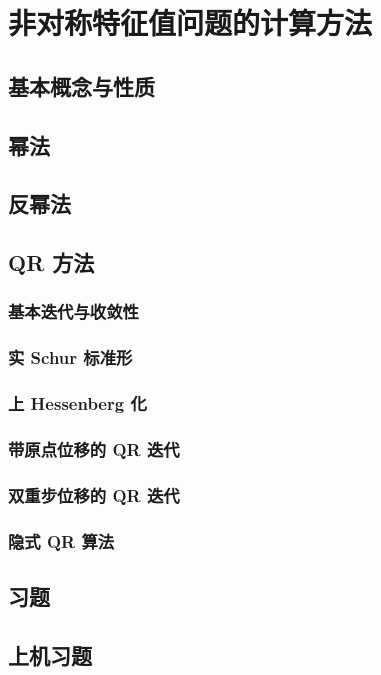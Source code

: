 \chapter{非对称特征值问题的计算方法}

\section{基本概念与性质}

\pending

\section{幂法}

\pending

\section{反幂法}

\pending

\section{QR 方法}

\subsection{基本迭代与收敛性}

\pending

\subsection{实 Schur 标准形}

\pending

\subsection{上 Hessenberg 化}

\pending

\subsection{带原点位移的 QR 迭代}

\pending

\subsection{双重步位移的 QR 迭代}

\pending

\subsection{隐式 QR 算法}

\pending

\section{习题}

\pending

\section{上机习题}

\pending
